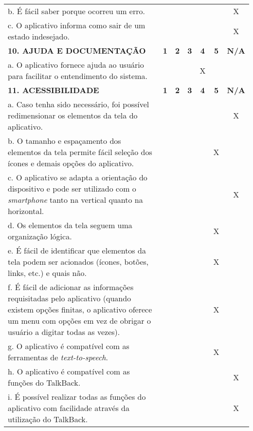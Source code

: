 \documentclass[portuguese,oneside]{tcc}
\begin{document}
\begin{center}
\begin{longtabu}{|L{25em}|c|c|c|c|c|c|}
																											b. É fácil saber porque ocorreu um erro. & & & & & & X \\ 
																											c. O aplicativo informa como sair de um estado indesejado. & & & & & & X \\ 
																											\textbf{10. AJUDA E DOCUMENTAÇÃO} & \textbf{1} & \textbf{2} & \textbf{3} & \textbf{4} & \textbf{5} & \textbf{N/A} \\ 
																											a. O aplicativo fornece ajuda ao usuário para facilitar o entendimento do sistema. & & & & X & & \\ 
																											\textbf{11. ACESSIBILIDADE} & \textbf{1} & \textbf{2} & \textbf{3} & \textbf{4} & \textbf{5} & \textbf{N/A} \\ 
																											a. Caso tenha sido necessário, foi possível redimensionar os elementos da tela do aplicativo. & & & & & & X \\ 
																											b. O tamanho e espaçamento dos elementos da tela permite fácil seleção dos ícones e demais opções do aplicativo. & & & & & X & \\ 
																											c. O aplicativo se adapta a orientação do dispositivo e pode ser utilizado com o \emph{smartphone} tanto na vertical quanto na horizontal. & & & & & & X \\ 
																											d. Os elementos da tela seguem uma organização lógica. & & & & & X & \\ 
																											e. É fácil de identificar que elementos da tela podem ser acionados (ícones, botões, links, etc.) e quais não. & & & & & X & \\ 
																											f. É fácil de adicionar as informações requisitadas pelo aplicativo (quando existem opções finitas, o aplicativo oferece um menu com opções em vez de obrigar o usuário a digitar todas as vezes). & & & & & X & \\ 
																											g. O aplicativo é compatível com as ferramentas de \emph{text-to-speech}. & & & & & X & \\ 
																											h. O aplicativo é compatível com as funções do TalkBack. & & & & & & X \\ 
																											i. É possível realizar todas as funções do aplicativo com facilidade através da utilização do TalkBack.	& & & & & & X \\ 

\end{longtabu}
\end{center}
\end{document}
